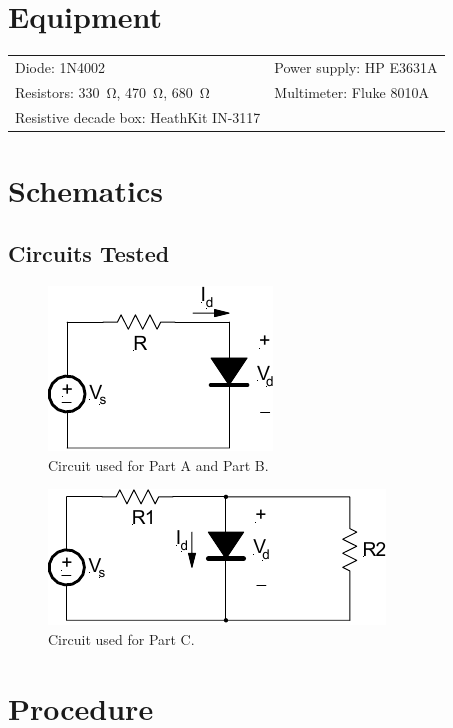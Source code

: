 \documentclass{article}
\begin{document}
\section{Equipment}
\label{sec:equipment}

\begin{tabular}{ll}
  \centering
  Diode: 1N4002 & Power supply: HP E3631A \\
  Resistors: \SI{330}{\ohm}, \SI{470}{\ohm}, \SI{680}{\ohm} & Multimeter: Fluke 8010A \\
  Resistive decade box: HeathKit IN-3117 & \\
\end{tabular}

\section{Schematics}
\label{sec:schematics}

\subsection{Circuits Tested}
\label{sec:ckt_tested}

\begin{figure}[hbtp]
  \centering
  \includegraphics[]{img/circuit1}
  \caption{\label{fig:circuit1} Circuit used for Part A and Part B.}
\end{figure}

\begin{figure}[hbtp]
  \centering
  \includegraphics[]{img/circuit2}
  \caption{\label{fig:circuit2} Circuit used for Part C.}
\end{figure}

\section{Procedure}
\label{sec:procedure}
\end{document}
